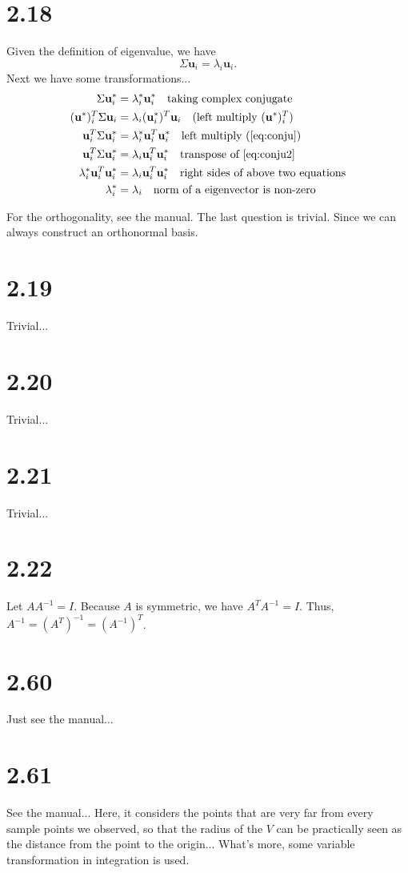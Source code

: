 \documentclass[12pt]{article}
\newcommand{\vect}[1]{\mathbf{#1}}
\begin{document}
\section{2.18}
Given the definition of eigenvalue, we have
\begin{equation}
    \Sigma \vect{u}_i = \lambda_i \vect{u}_i.
\end{equation}
Next we have some transformations...
\begin{align}
    \Sigma \vect{u}^*_i &= \lambda^*_i \vect{u}^*_i\quad \text{taking complex conjugate} \label{eq:conju} \\
    (\vect{u}^*)^T_i \Sigma \vect{u}_i & = \lambda_i (\vect{u}^*_i)^T \vect{u}_i \quad \text{(left multiply $(\vect{u}^*)^T_i$)} \label{eq:conju2} \\
    \vect{u}^T_i \Sigma \vect{u}^*_i &= \lambda^*_i \vect{u}^T_i \vect{u}^*_i \quad \text{left multiply (\ref{eq:conju})}\\
    \vect{u}^T_i \Sigma \vect{u}^*_i &= \lambda_i \vect{u}^T_i \vect{u}^*_i \quad \text{transpose of \ref{eq:conju2}}\\
    \lambda^*_i \vect{u}^T_i \vect{u}^*_i & = \lambda_i \vect{u}^T_i \vect{u}^*_i \quad\text{right sides of above two equations} \\
    \lambda^*_i &= \lambda_i \quad\text{norm of a eigenvector is non-zero}
\end{align}

For the orthogonality, see the manual. The last question is trivial. Since we can always construct an orthonormal basis.

\section{2.19}
Trivial...

\section{2.20}
Trivial...

\section{2.21}
Trivial...

\section{2.22}
Let $A A^{-1} = I$. Because $A$ is symmetric, we have $A^T A^{-1}= I$. Thus, $A^{-1} = (A^T)^{-1} = (A^{-1})^T $.

\section{2.60}
Just see the manual...

\section{2.61}
See the manual... Here, it considers the points that are very far from every sample points we observed, so that the radius of the $V$ can be practically seen as the distance from the point to the origin... What's more, some variable transformation in integration is used.
\end{document}
